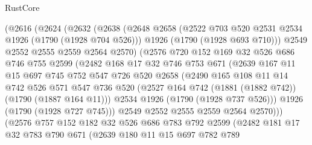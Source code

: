 \begin{lexlean}{RustCore}
\begin{coremodule}
            (@2616
              (@2624
                (@2632
                  (@2638
                    (@2648
                      @2658
                      (@2522 @703 @520 @2531 @2534 @1926 (@1790 (@1928 @704 @526)))
                      @1926
                      (@1790 (@1928 @693 @710)))
                    @2549
                    @2552
                    @2555
                    @2559
                    @2564
                    @2570)
                  (@2576
                    @720
                    @152
                    @169
                    @32
                    @526
                    @686
                    @746
                    @755
                    @2599
                    (@2482
                      @168
                      @17
                      @32
                      @746
                      @753
                      @671
                      (@2639
                        @167
                        @11
                        @15
                        @697
                        @745
                        @752
                        @547
                        @726
                        @520
                        @2658
                        (@2490
                          @165
                          @108
                          @11
                          @14
                          @742
                          @526
                          @571
                          @547
                          @736
                          @520
                          (@2527 @164 @742 (@1881 (@1882 @742)) (@1790 (@1887 @164 @11)))
                          @2534
                          @1926
                          (@1790 (@1928 @737 @526)))
                        @1926
                        (@1790 (@1928 @727 @745)))
                      @2549
                      @2552
                      @2555
                      @2559
                      @2564
                      @2570)))
                (@2576
                  @757
                  @152
                  @182
                  @32
                  @526
                  @686
                  @783
                  @792
                  @2599
                  (@2482
                    @181
                    @17
                    @32
                    @783
                    @790
                    @671
                    (@2639
                      @180
                      @11
                      @15
                      @697
                      @782
                      @789

\end{coremodule}
\end{lexlean}
